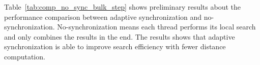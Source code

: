 %
%

%
%
%

Table~\ref{tab:comp_no_sync_bulk_step} shows preliminary results about the performance comparison between adaptive synchronization and no-synchronization. No-synchronization means each thread performs its local search and only combines the results in the end. The results shows that adaptive synchronization is able to improve search efficiency with fewer distance computation.

